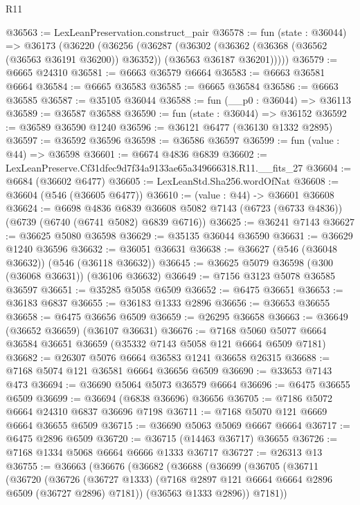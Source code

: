 \begin{lexlean}{R11}
\begin{coremodule}
@36563 := LexLeanPreservation.construct_pair
@36578 := fun (state : @36044) =>
  @36173
    (@36220
      (@36256
        (@36287
          (@36302
            (@36362 (@36368 (@36562 (@36563 @36191 @36200)) @36352))
            (@36563 @36187 @36201)))))
@36579 := @6665 @24310
@36581 := @6663 @36579 @6664
@36583 := @6663 @36581 @6664
@36584 := @6665 @36583
@36585 := @6665 @36584
@36586 := @6663 @36585
@36587 := @35105 @36044
@36588 := fun (__p0 : @36044) => @36113
@36589 := @36587 @36588
@36590 := fun (state : @36044) => @36152
@36592 := @36589 @36590 @1240
@36596 := @36121 @6477 (@36130 @1332 @2895)
@36597 := @36592 @36596
@36598 := @36586 @36597
@36599 := fun (value : @44) => @36598
@36601 := @6674 @4836 @6839
@36602 := LexLeanPreserve.Cf31dfec9d7f34a9133ae65a349666318.R11.__fits_27
@36604 := @6684 (@36602 @6477)
@36605 := LexLeanStd.Sha256.wordOfNat
@36608 := @36604 (@546 (@36605 @6477))
@36610 := (value : @44) -> @36601 @36608
@36624 := @6698
    @4836
    @6839
    @36608
    @5082
    @7143
    (@6723 (@6733 @4836))
    (@6739 (@6740 (@6741 @5082) @6839 @6716))
@36625 := @36241 @7143
@36627 := @36625 @5080 @36598
@36629 := @35135 @36044 @36590
@36631 := @36629 @1240 @36596
@36632 := @36051 @36631
@36638 := @36627 (@546 (@36048 @36632)) (@546 (@36118 @36632))
@36645 := @36625 @5079 @36598 (@300 (@36068 @36631)) (@36106 @36632)
@36649 := @7156 @3123 @5078 @36585 @36597
@36651 := @35285 @5058 @6509
@36652 := @6475 @36651
@36653 := @36183 @6837
@36655 := @36183 @1333 @2896
@36656 := @36653 @36655
@36658 := @6475 @36656 @6509
@36659 := @26295 @36658
@36663 := @36649 (@36652 @36659) (@36107 @36631)
@36676 := @7168 @5060 @5077 @6664 @36584 @36651 @36659 (@35332 @7143 @5058 @121 @6664 @6509 @7181)
@36682 := @26307 @5076 @6664 @36583 @1241 @36658 @26315
@36688 := @7168 @5074 @121 @36581 @6664 @36656 @6509
@36690 := @33653 @7143 @473
@36694 := @36690 @5064 @5073 @36579 @6664
@36696 := @6475 @36655 @6509
@36699 := @36694 (@6838 @36696) @36656
@36705 := @7186 @5072 @6664 @24310 @6837 @36696 @7198
@36711 := @7168 @5070 @121 @6669 @6664 @36655 @6509
@36715 := @36690 @5063 @5069 @6667 @6664
@36717 := @6475 @2896 @6509
@36720 := @36715 (@14463 @36717) @36655
@36726 := @7168 @1334 @5068 @6664 @6666 @1333 @36717
@36727 := @26313 @13
@36755 := @36663
    (@36676
      (@36682
        (@36688
          (@36699
            (@36705
              (@36711
                (@36720
                  (@36726
                    (@36727 @1333)
                    (@7168 @2897 @121 @6664 @6664 @2896 @6509 (@36727 @2896) @7181))
                  (@36563 @1333 @2896))
                @7181))

\end{coremodule}
\end{lexlean}
